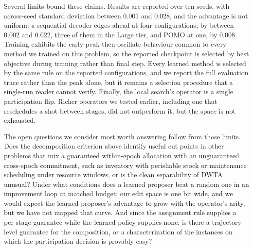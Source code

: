 Several limits bound these claims. Results are reported over ten seeds, with
across-seed standard deviation between 0.001 and 0.028, and the advantage is
not uniform: a sequential decoder edges ahead at four configurations, by
between 0.002 and 0.022, three of them in the Large tier, and POMO at one, by
0.008. Training exhibits the early-peak-then-oscillate behaviour common to
every method we trained on this problem, so the reported checkpoint is
selected by best objective during training rather than final step. Every
learned method is selected by the same rule on the reported configurations,
and we report the full evaluation trace rather than the peak alone, but it
remains a selection procedure that a single-run reader cannot verify. Finally, the local search's operator is a single participation flip.
Richer operators we tested earlier, including one that reschedules a shot
between stages, did not outperform it, but the space is not exhausted.

The open questions we consider most worth answering follow from those limits.
Does the decomposition criterion above identify useful cut points in other
problems that mix a guaranteed within-epoch allocation with an unguaranteed
cross-epoch commitment, such as inventory with perishable stock or maintenance scheduling under resource windows, or is the clean separability of DWTA
unusual? Under what conditions does a learned proposer beat a random one in
an improvement loop at matched budget; our edit space is one bit wide, and we
would expect the learned proposer's advantage to grow with the operator's
arity, but we have not mapped that curve. And since the assignment rule
supplies a per-stage guarantee while the learned policy supplies none, is there a
trajectory-level guarantee for the composition, or a characterization of the
instances on which the participation decision is provably easy?
